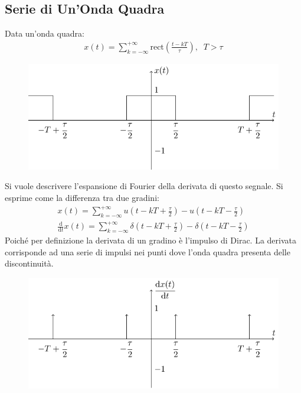 \documentclass{article}
\newcommand{\rect}{\mathrm{rect}}
\newcommand{\df}{\mathrm{d}}
\numberwithin{equation}{subsection}
\begin{document}
\subsection{Serie di Un'Onda Quadra}

Data un'onda quadra: 
\begin{gather*}
    x(t)=\displaystyle\sum_{k=-\infty}^{+\infty}\rect{\left(\frac{t-kT}{\tau}\right)},\;\; T>\tau
\end{gather*}

\begin{figure}[H]%
    \centering
    \includegraphics{onda-quadra-3.pdf}%
\end{figure}

Si vuole descrivere l'espansione  di Fourier della derivata di questo segnale. Si esprime come la differenza tra due gradini:
\begin{gather*}
    x(t)=\displaystyle\sum_{k=-\infty}^{+\infty}u\left(t-kT+\frac{\tau}{2}\right)-u\left(t-kT-\frac{\tau}{2}\right)\\
    \displaystyle\frac{\df}{\df t}x(t)=\sum_{k=-\infty}^{+\infty}\delta\left(t-kT+\frac{\tau}{2}\right)-\delta\left(t-kT-\frac{\tau}{2}\right)
\end{gather*}
Poiché per definizione la derivata di un gradino è l'impulso di Dirac. La derivata corrisponde ad una serie di impulsi nei punti dove l'onda quadra presenta delle discontinuità. 

\begin{figure}[H]%
    \centering
    \includegraphics{serie-impulsi-1.pdf}%
\end{figure}
\end{document}
